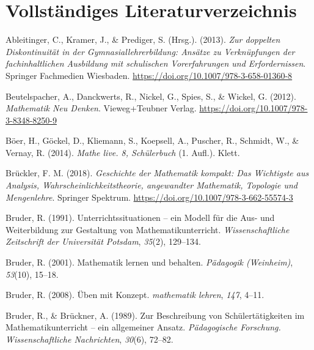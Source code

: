 \documentclass[
]{scrbook}
\newlength{\cslhangindent}
\newenvironment{CSLReferences}[2] %
 {\begin{list}{}{%
  \setlength{\itemindent}{0pt}
  \setlength{\leftmargin}{0pt}
  \setlength{\parsep}{0pt}
  \ifodd #1
   \setlength{\leftmargin}{\cslhangindent}
   \setlength{\itemindent}{-1\cslhangindent}
  \fi
  \setlength{\itemsep}{#2\baselineskip}}}
 {\end{list}}
\theoremstyle{definition}
\theoremstyle{definition}
\theoremstyle{definition}
\theoremstyle{definition}
\theoremstyle{remark}
\begin{document}
\chapter{Vollständiges Literaturverzeichnis}\label{vollstuxe4ndiges-literaturverzeichnis}

\label{refs}
\begin{CSLReferences}{1}{0}
Ableitinger, C., Kramer, J., \& Prediger, S. (Hrsg.). (2013). \emph{Zur doppelten {Diskontinuität} in der {Gymnasiallehrerbildung}: {Ansätze} zu {Verknüpfungen} der fachinhaltlichen {Ausbildung} mit schulischen {Vorerfahrungen} und {Erfordernissen}}. Springer Fachmedien Wiesbaden. \url{https://doi.org/10.1007/978-3-658-01360-8}

Beutelspacher, A., Danckwerts, R., Nickel, G., Spies, S., \& Wickel, G. (2012). \emph{Mathematik {Neu} {Denken}}. Vieweg+Teubner Verlag. \url{https://doi.org/10.1007/978-3-8348-8250-9}

Böer, H., Göckel, D., Kliemann, S., Koepsell, A., Puscher, R., Schmidt, W., \& Vernay, R. (2014). \emph{Mathe live. 8, {Schülerbuch}} (1. Aufl.). Klett.

Brückler, F. M. (2018). \emph{Geschichte der {Mathematik} kompakt: {Das} {Wichtigste} aus {Analysis}, {Wahrscheinlichkeitstheorie}, angewandter {Mathematik}, {Topologie} und {Mengenlehre}}. Springer Spektrum. \url{https://doi.org/10.1007/978-3-662-55574-3}

Bruder, R. (1991). Unterrichtssituationen -- ein {Modell} für die {Aus}- und {Weiterbildung} zur {Gestaltung} von {Mathematikunterricht}. \emph{Wissenschaftliche Zeitschrift der Universität Potsdam}, \emph{35}(2), 129--134.

Bruder, R. (2001). Mathematik lernen und behalten. \emph{Pädagogik (Weinheim)}, \emph{53}(10), 15--18.

Bruder, R. (2008). Üben mit {Konzept}. \emph{mathematik lehren}, \emph{147}, 4--11.

Bruder, R., \& Brückner, A. (1989). Zur {Beschreibung} von {Schülertätigkeiten} im {Mathematikunterricht} -- ein allgemeiner {Ansatz}. \emph{Pädagogische Forschung. Wissenschaftliche Nachrichten}, \emph{30}(6), 72--82.


\end{CSLReferences}
\end{document}
